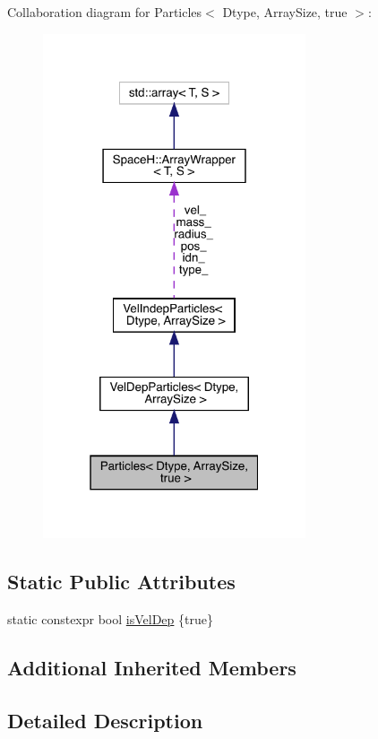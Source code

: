 Collaboration diagram for Particles$<$ Dtype, Array\+Size, true $>$\+:\nopagebreak
\begin{figure}[H]
\begin{center}
\leavevmode
\includegraphics[width=220pt]{struct_particles_3_01_dtype_00_01_array_size_00_01true_01_4__coll__graph}
\end{center}
\end{figure}
\subsection*{Static Public Attributes}
\begin{DoxyCompactItemize}
\item 
static constexpr bool \mbox{\hyperlink{struct_particles_3_01_dtype_00_01_array_size_00_01true_01_4_ac9666d6f9fffae715f8cce7afbf5e3e5}{is\+Vel\+Dep}} \{true\}
\end{DoxyCompactItemize}
\subsection*{Additional Inherited Members}


\subsection{Detailed Description}
